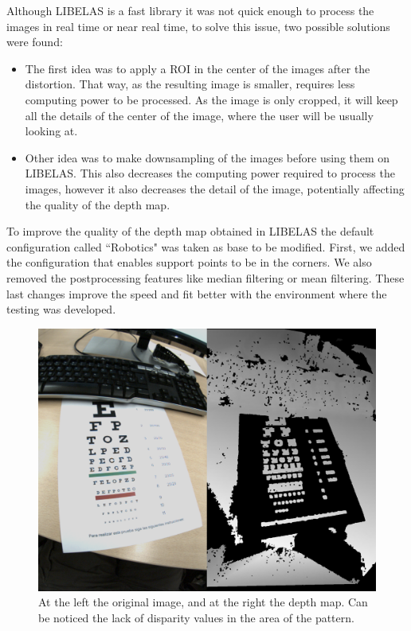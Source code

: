 \documentclass[10pt,a4paper,twocolumn,twoside]{article}
\begin{document}
	 Although LIBELAS is a fast library it was not quick enough to process the images in real time or near real time, to solve this issue, two possible solutions were found:
	 
	 \begin{itemize}
	 	\item The first idea was to apply a ROI in the center of the images after the distortion. That way, as the resulting image is smaller, requires less computing power to be processed. As the image is only cropped, it will keep all the details of the center of the image, where the user will be usually looking at.  
	 	 
	 	\item Other idea was to make downsampling of the images before using them on LIBELAS. This also decreases the computing power required to process the images, however it also decreases the detail of the image, potentially affecting the quality of the depth map.  
 	 \end{itemize}
	 
	 To improve the quality of the depth map obtained in LIBELAS the default configuration called ``Robotics" was taken as base to be modified. First, we added the configuration that enables support points to be in the corners. We also removed the postprocessing features like median filtering or mean filtering. These last changes improve the speed and fit better with the environment where the testing was developed.
	 
 	\begin{figure}
 		\centering
 		\includegraphics[width=\linewidth]{img/depthdistort.png}
 		\caption{At the left the original image, and at the right the depth map. Can be noticed the lack of disparity values in the area of the pattern.}
 		\label{fig:disparity}
 \end{figure}
	 
\end{document}
